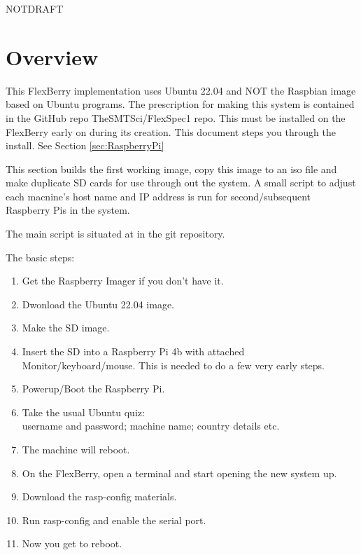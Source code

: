 \documentclass[letter,11pt,oneside]{article}
\def\documentisdraft{NOTDRAFT}
\newcommand{\dhl}[1]{{\color{verbcolor}{\texttt#1}}}
\begin{document}
\clearpage
{}   %
\tableofcontents
\listoffigures
\listoftables
\newpage


\setcounter{section}{1}

\ifx\documentisdraft\drafttest
\linenumbers    %
\fi
{}

\section*{Overview}
\setcounter{page}{1}

This FlexBerry implementation uses Ubuntu 22.04 and NOT the Raspbian
image based on Ubuntu programs. The prescription for making this
system is contained in the GitHub repo TheSMTSci/FlexSpec1 repo. This
must be installed on the FlexBerry early on during its creation. This
document steps you through the install. See Section \ref{sec:RaspberryPi}

This section builds the first working image, copy this image to an
iso file and make duplicate SD cards for use through out the system.
A small script to adjust each macnine's host name and IP address is
run for second/subsequent Raspberry Pis in the system.

The main script is situated at \dhl{\$HOME/git/FlexSpec1/code/HOME/FollowMe.sh}
in the git repository.

The basic steps:
\vspace{-.15cm}
\begin{enumerate}\addtolength{\itemsep}{-0.5\baselineskip}
   \item   Get the Raspberry Imager if you don't have it.
   \item   Dwonload the Ubuntu 22.04 image.
   \item   Make the SD image.
   \item   Insert the SD into a Raspberry Pi 4b with attached Monitor/keyboard/mouse.
  This is needed to do a few very early steps.
   \item   Powerup/Boot the Raspberry Pi.
   \item   Take the usual Ubuntu quiz:\\
        username and password; machine name; country details etc.
   \item   The machine will reboot.
   \item   On the FlexBerry, open a terminal and start opening the new system up.
   \item   Download the rasp-config materials.
   \item   Run rasp-config and enable the serial port.
   \item   Now you get to reboot.
\end{enumerate}
\end{document}
